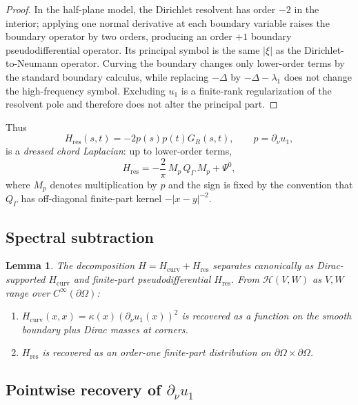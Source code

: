 \documentclass[11pt,reqno]{amsart}
\theoremstyle{plain}
\newtheorem{lemma}[theorem]{Lemma}
\theoremstyle{definition}
\theoremstyle{remark}
\newcommand{\Qop}{Q}
\newcommand{\Hcal}{\mathcal{H}}
\begin{document}
\begin{proof}
In the half-plane model, the Dirichlet resolvent has order $-2$ in the interior; applying one normal derivative at each boundary variable raises the boundary operator by two orders, producing an order $+1$ boundary pseudodifferential operator. Its principal symbol is the same $|\xi|$ as the Dirichlet-to-Neumann operator. Curving the boundary changes only lower-order terms by the standard boundary calculus, while replacing $-\Delta$ by $-\Delta-\lambda_1$ does not change the high-frequency symbol. Excluding $u_1$ is a finite-rank regularization of the resolvent pole and therefore does not alter the principal part.
\end{proof}

Thus
\[
H_{\mathrm{res}}(s,t)
=-2p(s)p(t)G_R(s,t),\qquad p=\partial_\nu u_1,
\]
is a \emph{dressed chord Laplacian}: up to lower-order terms,
\[
H_{\mathrm{res}}
=-\frac{2}{\pi}\,M_p\,\Qop_\Gamma\,M_p+\Psi^0,
\]
where $M_p$ denotes multiplication by $p$ and the sign is fixed by the convention that $\Qop_\Gamma$ has off-diagonal finite-part kernel $-|x-y|^{-2}$.

\subsection{Spectral subtraction}\label{ss:spectral-sub-master}

\begin{lemma}\label{lem:spectral-sub-master}
The decomposition $H = H_{\mathrm{curv}} + H_{\mathrm{res}}$ separates canonically as Dirac-supported $H_{\mathrm{curv}}$ and finite-part pseudodifferential $H_{\mathrm{res}}$. From $\Hcal(V, W)$ as $V, W$ range over $C^\infty(\partial\Omega)$:
\begin{enumerate}
\item[\rm(i)] $H_{\mathrm{curv}}(x, x) = \kappa(x)(\partial_\nu u_1(x))^2$ is recovered as a function on the smooth boundary plus Dirac masses at corners.
\item[\rm(ii)] $H_{\mathrm{res}}$ is recovered as an order-one finite-part distribution on $\partial\Omega\times\partial\Omega$.
\end{enumerate}
\end{lemma}

\subsection{Pointwise recovery of \texorpdfstring{$\partial_\nu u_1$}{partial nu u1}}\label{ss:flux-recovery-master}
\end{document}
